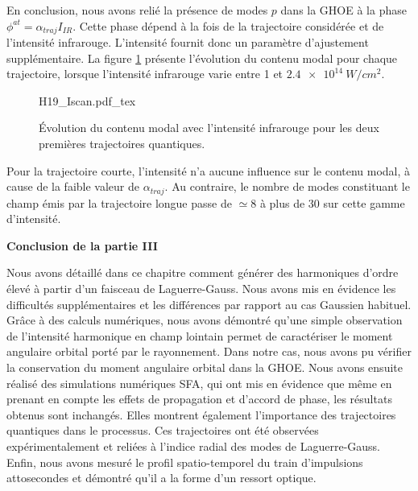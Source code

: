 En conclusion, nous avons relié la présence de modes $p$ dans la GHOE à la phase $\phi^{at}=\alpha_{traj} I_{IR}$. Cette phase dépend à la fois de la trajectoire considérée et de l'intensité infrarouge. L'intensité fournit donc un paramètre d'ajustement supplémentaire. La figure \ref{Fig:H19_Iscan} présente l'évolution du contenu modal pour chaque trajectoire, lorsque l'intensité infrarouge varie entre 1 et $\SI{2.4e14}{W/cm^2}$.

\begin{figure}[!ht]
\centering
\def\svgwidth{0.9\columnwidth}
{H19_Iscan.pdf_tex}
\caption{\'Evolution du contenu modal avec l'intensité infrarouge pour les deux premières trajectoires quantiques.}
\label{Fig:H19_Iscan}
\end{figure}

Pour la trajectoire courte, l'intensité n'a aucune influence sur le contenu modal, à cause de la faible valeur de $\alpha_{traj}$. Au contraire, le nombre de modes constituant le champ émis par la trajectoire longue passe de $\simeq 8$ à plus de 30 sur cette gamme d'intensité. 

\textbf{{Conclusion de la partie III}}\par
Nous avons détaillé dans ce chapitre comment générer des harmoniques d'ordre élevé à partir d'un faisceau de Laguerre-Gauss. Nous avons mis en évidence les difficultés supplémentaires et les différences par rapport au cas Gaussien habituel. Grâce à des calculs numériques, nous avons démontré qu'une simple observation de l'intensité harmonique en champ lointain permet de caractériser le moment angulaire orbital porté par le rayonnement. Dans notre cas, nous avons pu vérifier la conservation du moment angulaire orbital dans la GHOE. Nous avons ensuite réalisé des simulations numériques SFA, qui ont mis en évidence que même en prenant en compte les effets de propagation et d'accord de phase, les résultats obtenus sont inchangés. Elles montrent également l'importance des trajectoires quantiques dans le processus. Ces trajectoires ont été observées expérimentalement et reliées à l'indice radial des modes de Laguerre-Gauss. Enfin, nous avons mesuré le profil spatio-temporel du train d'impulsions attosecondes et démontré qu'il a la forme d'un ressort optique.

